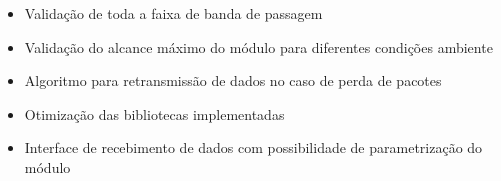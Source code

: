 \documentclass[
	12pt,				%
	openright,			%
	twoside,			%
	a4paper,			%
	english,			%
	french,				%
	spanish,			%
	brazil,				%
	]{abntex2}
\begin{document}
	\begin{itemize}
		\item Validação de toda a faixa de banda de passagem
		\item Validação do alcance máximo do módulo para diferentes condições ambiente
		\item Algoritmo para retransmissão de dados no caso de perda de pacotes
		\item Otimização das bibliotecas implementadas
		\item Interface de recebimento de dados com possibilidade de parametrização do módulo
	\end{itemize}


% 

\postextual

% 


\end{document}
